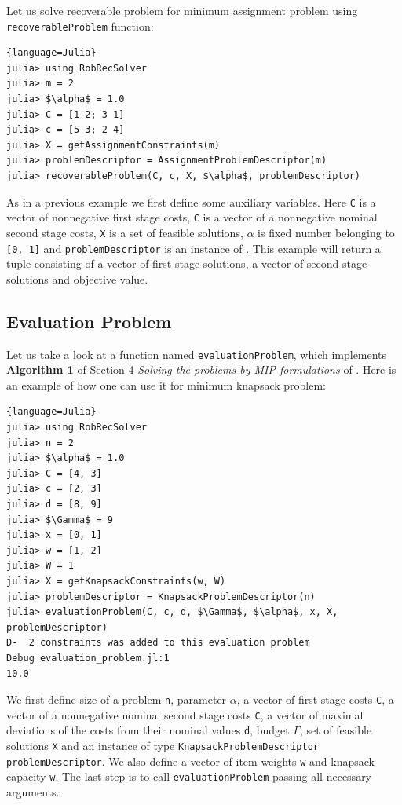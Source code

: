 Let us solve recoverable problem for minimum assignment problem using \texttt{recoverableProblem} function:
\begin{lstlisting}[mathescape]{language=Julia}
julia> using RobRecSolver
julia> m = 2
julia> $\alpha$ = 1.0
julia> C = [1 2; 3 1]
julia> c = [5 3; 2 4]
julia> X = getAssignmentConstraints(m)
julia> problemDescriptor = AssignmentProblemDescriptor(m)
julia> recoverableProblem(C, c, X, $\alpha$, problemDescriptor)
\end{lstlisting}
As in a previous example we first define some auxiliary variables. Here  \texttt{C} is a vector of nonnegative first stage costs,  \texttt{C} is a vector of a nonnegative nominal second stage costs, \texttt{X} is a set of feasible solutions,  \texttt{$\alpha$} is fixed number belonging to \texttt{[0, 1]} and \texttt{problemDescriptor} is an instance of \texttt{}. This example will return a tuple consisting of a vector of first stage solutions, a vector of second stage solutions and objective value.

\subsection{Evaluation Problem}
Let us take a look at a function named \texttt{evaluationProblem}, which implements \textbf{Algorithm 1} of Section 4 \textit{Solving the problems by MIP formulations} of \cite{DBLP:journals/corr/abs-1811-06719}. Here is an example of how one can use it for minimum knapsack problem:
\begin{lstlisting}[mathescape]{language=Julia}
julia> using RobRecSolver
julia> n = 2
julia> $\alpha$ = 1.0
julia> C = [4, 3]
julia> c = [2, 3]
julia> d = [8, 9]
julia> $\Gamma$ = 9
julia> x = [0, 1]
julia> w = [1, 2]
julia> W = 1
julia> X = getKnapsackConstraints(w, W)
julia> problemDescriptor = KnapsackProblemDescriptor(n)
julia> evaluationProblem(C, c, d, $\Gamma$, $\alpha$, x, X, problemDescriptor)
D-  2 constraints was added to this evaluation problem                 Debug evaluation_problem.jl:1
10.0
\end{lstlisting}
We first define size of a problem \texttt{n}, parameter  \texttt{$\alpha$}, a vector of first stage costs  \texttt{C}, a vector of a nonnegative nominal second stage costs  \texttt{C}, a vector of maximal deviations of the costs from their nominal values  \texttt{d}, budget  \texttt{$\Gamma$}, set of feasible solutions \texttt{X} and an instance of type \texttt{KnapsackProblemDescriptor} \texttt{problemDescriptor}. We also define a vector of item weights \texttt{w} and knapsack capacity \texttt{w}. The last step is to call \texttt{evaluationProblem} passing all necessary arguments.

